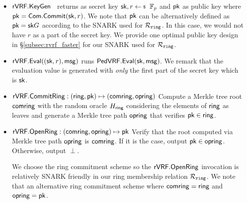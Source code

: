 \begin{itemize}
	\item ${\mathsf{rVRF}}.{\mathsf{KeyGen}}$ \, returns as secret key $\sk,r \leftsample \F_p$ and $ \mathsf{pk} $ as public key where $ \mathsf{pk} = \mathsf{Com}.\mathsf{Commit}(\mathsf{sk},r)  $. We note that $ \mathsf{pk}  $ can be alternatively defined as $ \mathsf{pk} = \mathsf{sk} G $ according to the SNARK used for $ \mathcal{R}_{\mathtt{ring}} $. In this case, we would not have $ r $ as a part of the secret key.  We provide one optimal public key design in \S\ref{subsec:rvrf_faster} for our SNARK used for $ \mathcal{R}_{\mathtt{ring}} $. 
	
	\item ${\mathsf{rVRF}}.{\mathsf{Eval}}((\mathsf{sk},r), \mathsf{msg}) $ runs ${\mathsf{PedVRF}}.{\mathsf{Eval}}(\mathsf{sk},\mathsf{msg})$. We remark that the evaluation value is generated with \emph{only} the first part of the secret key which is $ \mathsf{sk} $.
	
	\item $ {\mathsf{rVRF}}.{\mathsf{CommitRing}}: (\mathsf{ring},\mathsf{pk}) \mapsto (\mathsf{comring},\mathsf{opring})$ Compute a Merkle tree root $\mathsf{comring}  $ with the random oracle $ H_\mathsf{ring} $ considering the elements of $ \mathsf{ring} $ as leaves and generate a  Merkle tree path $ \mathsf{opring} $ that verifies $ \mathsf{pk} \in \mathsf{ring} $.
	
	\item $ {\mathsf{rVRF}}.{\mathsf{OpenRing}}: (\mathsf{comring}, \mathsf{opring}) \mapsto \mathsf{pk} $ Verify that the root computed via Merkle tree path $ \mathsf{opring} $ is  $ \mathsf{comring} $. If it is the case, output $ \mathsf{pk} \in \mathsf{opring} $. Otherwise, output $ \perp $. 
	
	We choose the ring commitment scheme so the ${\mathsf{rVRF}}.{\mathsf{OpenRing}}$ invocation
	is relatively SNARK friendly in our ring membership relation $ \mathcal{R}_{\mathtt{ring}} $. We note that an alternative ring commitment scheme where $ \mathsf{comring} = \mathsf{ring} $ and $ \mathsf{opring} = \mathsf{pk} $.
	
	
	
\end{itemize}

